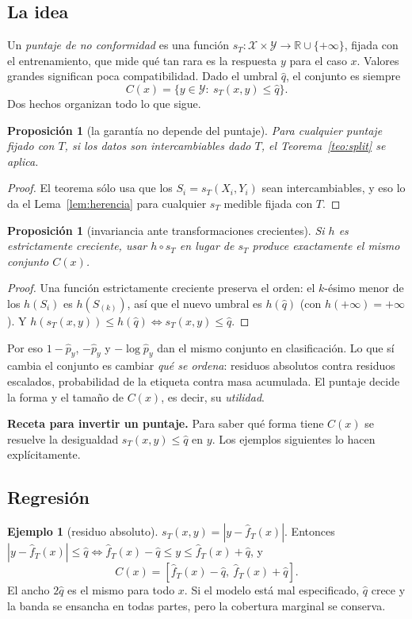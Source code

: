 \documentclass[11pt]{article}
\theoremstyle{plain}
\newtheorem{proposicion}[teorema]{Proposición}
\theoremstyle{definition}
\newtheorem{ejemplo}[teorema]{Ejemplo}
\theoremstyle{remark}
\newcommand{\qhat}{\widehat q}
\newcommand{\fhat}{\widehat f_T}
\newcommand{\phat}{\widehat p}
\newcommand{\dest}[1]{\par\needspace{4\baselineskip}\textbf{#1}\quad}
\begin{document}
\subsection{La idea}
Un \emph{puntaje de no conformidad} es una función $s_T:\mathcal X\times\mathcal Y\to\mathbb
R\cup\{+\infty\}$, fijada con el entrenamiento, que mide qué tan rara es la respuesta $y$ para el caso
$x$. Valores grandes significan poca compatibilidad. Dado el umbral $\qhat$, el conjunto es siempre
\[
 C(x)=\{y\in\mathcal Y:\ s_T(x,y)\le\qhat\}.
\]
Dos hechos organizan todo lo que sigue.

\begin{proposicion}[la garantía no depende del puntaje]
Para cualquier puntaje fijado con $T$, si los datos son intercambiables dado $T$, el
Teorema~\ref{teo:split} se aplica.
\end{proposicion}
\begin{proof}
El teorema sólo usa que los $S_i=s_T(X_i,Y_i)$ sean intercambiables, y eso lo da el
Lema~\ref{lem:herencia} para cualquier $s_T$ medible fijada con $T$.
\end{proof}

\begin{proposicion}[invariancia ante transformaciones crecientes]\label{prop:monotona}
Si $h$ es estrictamente creciente, usar $h\circ s_T$ en lugar de $s_T$ produce exactamente el mismo
conjunto $C(x)$.
\end{proposicion}
\begin{proof}
Una función estrictamente creciente preserva el orden: el $k$-ésimo menor de los $h(S_i)$ es
$h(S_{(k)})$, así que el nuevo umbral es $h(\qhat)$ (con $h(+\infty)=+\infty$). Y
$h(s_T(x,y))\le h(\qhat)\iff s_T(x,y)\le\qhat$.
\end{proof}
Por eso $1-\phat_y$, $-\phat_y$ y $-\log\phat_y$ dan el mismo conjunto en clasificación. Lo que sí
cambia el conjunto es cambiar \emph{qué se ordena}: residuos absolutos contra residuos escalados,
probabilidad de la etiqueta contra masa acumulada. El puntaje decide la forma y el tamaño de $C(x)$,
es decir, su \emph{utilidad}.

\dest{Receta para invertir un puntaje.} Para saber qué forma tiene $C(x)$ se resuelve la
desigualdad $s_T(x,y)\le\qhat$ en $y$. Los ejemplos siguientes lo hacen explícitamente.

\subsection{Regresión}
\begin{ejemplo}[residuo absoluto]
$s_T(x,y)=|y-\fhat(x)|$. Entonces $|y-\fhat(x)|\le\qhat\iff\fhat(x)-\qhat\le y\le\fhat(x)+\qhat$, y
\[
 C(x)=[\fhat(x)-\qhat,\ \fhat(x)+\qhat].
\]
El ancho $2\qhat$ es el mismo para todo $x$. Si el modelo está mal especificado, $\qhat$ crece y la
banda se ensancha en todas partes, pero la cobertura marginal se conserva.
\end{ejemplo}
\end{document}
